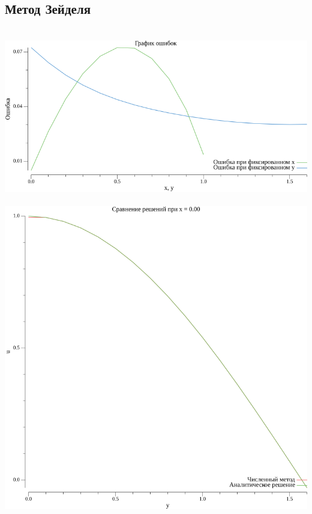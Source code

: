 \documentclass{article}
\begin{document}
\subsection*{Метод Зейделя}
\\
\includegraphics[scale=0.6]{error_plot_1.png}
\\

\\
\includegraphics[scale=0.6]{1plot_x_0.00.png}
\\
\end{document}
